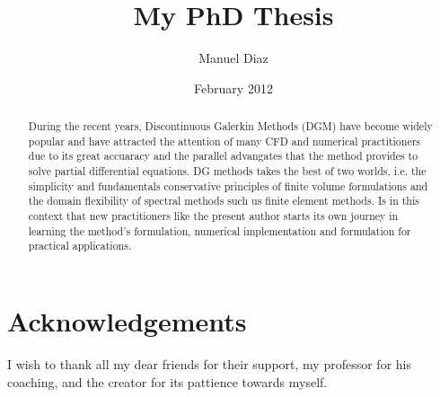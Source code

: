 \documentclass[a4paper]{report}
\begin{document}
\author{Manuel Diaz}
\title{My PhD Thesis}
\date{February 2012}
\maketitle

\tableofcontents

\chapter*{Acknowledgements}
I wish to thank all my dear friends for their support, my professor for his coaching, and the creator for its pattience towards myself.

\begin{abstract}
During the recent years, Discontinuous Galerkin Methods (DGM) have become widely popular and have attracted the attention of many CFD and numerical practitioners due to its great accuaracy and the parallel advangates that the method provides to solve partial differential equations. DG methods takes the best of two worlds, i.e. the simplicity and fundamentals conservative principles of finite volume formulations and the domain flexibility of spectral methods such us finite element methods. Is in this context that new practitioners like the present author starts its own journey in learning the method's formulation, numerical implementation and formulation for practical applications. 
\end{abstract}




%

	
	
	
	
	



\end{document}
